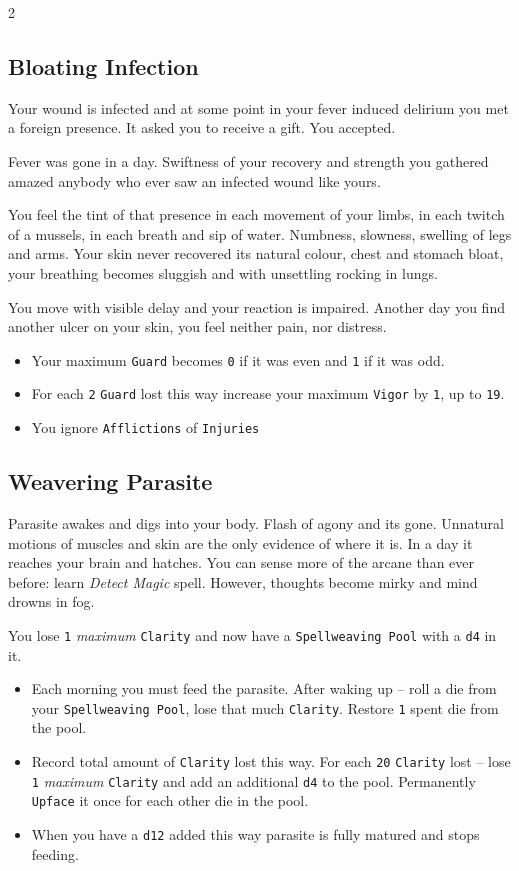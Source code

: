 \documentclass{osr-template/zine}
\begin{document}
\begin{multicols*}{2}
\subsection*{Bloating Infection}

Your wound is infected and at some point in your fever induced delirium you met a foreign presence.
It asked you to receive a gift. You accepted.

Fever was gone in a day. Swiftness of your recovery and strength you gathered amazed anybody who ever saw an infected wound like yours.

You feel the tint of that presence in each movement of your limbs, in each twitch of a mussels, in each breath and sip of water.
Numbness, slowness, swelling of legs and arms. Your skin never recovered its natural colour, chest and stomach bloat, your breathing becomes sluggish and with unsettling rocking in lungs.

You move with visible delay and your reaction is impaired.
Another day you find another ulcer on your skin, you feel neither pain, nor distress.

\begin{itemize}[nosep]
    \item Your maximum \texttt{Guard} becomes \texttt{0} if it was even and \texttt{1} if it was odd.
    \item For each \texttt{2} \texttt{Guard} lost this way increase your maximum \texttt{Vigor} by \texttt{1}, up to \texttt{19}.
    \item You ignore \texttt{Afflictions} of \texttt{Injuries}
\end{itemize}

\subsection*{Weavering Parasite}

Parasite awakes and digs into your body.
Flash of agony and its gone. Unnatural motions of muscles and skin are the only evidence of where it is.
In a day it reaches your brain and hatches. You can sense more of the arcane than ever before: learn \textit{Detect Magic} spell.
However, thoughts become mirky and mind drowns in fog.

You lose \texttt{1} \textit{maximum} \texttt{Clarity} and now have a \texttt{Spellweaving Pool} with a \texttt{d4} in it.

\begin{itemize}[nosep]
    \item Each morning you must feed the parasite.
    After waking up -- roll a die from your \texttt{Spellweaving Pool}, lose that much \texttt{Clarity}.
    Restore \texttt{1} spent die from the pool.
    \item Record total amount of \texttt{Clarity} lost this way.
    For each \texttt{20} \texttt{Clarity} lost -- lose \texttt{1} \textit{maximum} \texttt{Clarity} and add an additional \texttt{d4} to the pool.
    Permanently \texttt{Upface} it once for each other die in the pool.
    \item When you have a \texttt{d12} added this way parasite is fully matured and stops feeding.


\end{itemize}
\end{multicols*}
\end{document}
